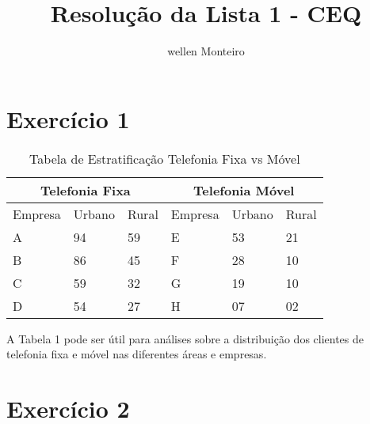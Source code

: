 \documentclass{article}
\title{Resolução da Lista 1 - CEQ}
\author{wellen Monteiro}
\date{}
\begin{document}
\maketitle

\section*{Exercício 1}


\begin{table}[h!]
\centering
\caption{Tabela de Estratificação Telefonia Fixa vs Móvel}
\begin{tabular}{|lll|lll|}
\hline
\multicolumn{3}{|c|}{Telefonia Fixa}                                & \multicolumn{3}{c|}{Telefonia Móvel}                               \\ \hline
\multicolumn{1}{|l|}{Empresa} & \multicolumn{1}{l|}{Urbano} & Rural & \multicolumn{1}{l|}{Empresa} & \multicolumn{1}{l|}{Urbano} & Rural \\ \hline
\multicolumn{1}{|l|}{A}       & \multicolumn{1}{l|}{94}     & 59    & \multicolumn{1}{l|}{E}       & \multicolumn{1}{l|}{53}     & 21    \\ \hline
\multicolumn{1}{|l|}{B}       & \multicolumn{1}{l|}{86}     & 45    & \multicolumn{1}{l|}{F}       & \multicolumn{1}{l|}{28}     & 10    \\ \hline
\multicolumn{1}{|l|}{C}       & \multicolumn{1}{l|}{59}     & 32    & \multicolumn{1}{l|}{G}       & \multicolumn{1}{l|}{19}     & 10    \\ \hline
\multicolumn{1}{|l|}{D}       & \multicolumn{1}{l|}{54}     & 27    & \multicolumn{1}{l|}{H}       & \multicolumn{1}{l|}{07}     & 02    \\ \hline
\end{tabular}
\end{table}

A  Tabela 1  pode ser útil para análises sobre a distribuição dos clientes de telefonia fixa e móvel nas diferentes áreas e empresas.

\section*{Exercício 2}
\end{document}
